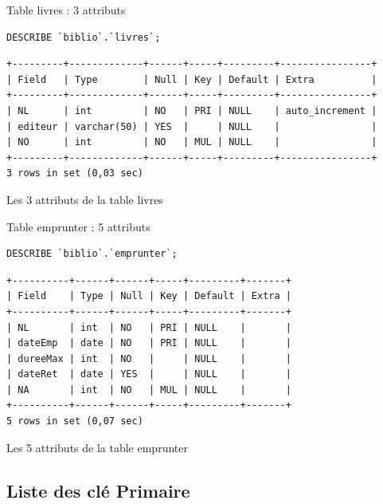 \documentclass{article}
\begin{document}
\begin{center}
\vspace*{20pt}

\begin{minipage}{0.8\linewidth}
Table livres : 3 attributs
\begin{listing}[H]
\begin{verbatim}
DESCRIBE `biblio`.`livres`;
\end{verbatim}
\begin{verbatim}
+---------+-------------+------+-----+---------+----------------+
| Field   | Type        | Null | Key | Default | Extra          |
+---------+-------------+------+-----+---------+----------------+
| NL      | int         | NO   | PRI | NULL    | auto_increment |
| editeur | varchar(50) | YES  |     | NULL    |                |
| NO      | int         | NO   | MUL | NULL    |                |
+---------+-------------+------+-----+---------+----------------+
3 rows in set (0,03 sec)
\end{verbatim}
\caption{Les 3 attributs de la table livres}
\end{listing}
\end{minipage}

\vspace*{20pt}

\begin{minipage}{0.8\linewidth}
Table emprunter : 5 attributs
\begin{listing}[H]
\begin{verbatim}
DESCRIBE `biblio`.`emprunter`;
\end{verbatim}
\begin{verbatim}
+----------+------+------+-----+---------+-------+
| Field    | Type | Null | Key | Default | Extra |
+----------+------+------+-----+---------+-------+
| NL       | int  | NO   | PRI | NULL    |       |
| dateEmp  | date | NO   | PRI | NULL    |       |
| dureeMax | int  | NO   |     | NULL    |       |
| dateRet  | date | YES  |     | NULL    |       |
| NA       | int  | NO   | MUL | NULL    |       |
+----------+------+------+-----+---------+-------+
5 rows in set (0,07 sec)
\end{verbatim}
\caption{Les 5 attributs de la table emprunter}
\end{listing}
\end{minipage}
\end{center}


\newpage
\subsection{Liste des clé Primaire}
\end{document}
